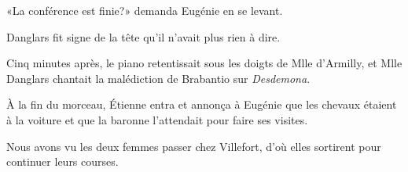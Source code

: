«La conférence est finie?» demanda Eugénie en se levant. 

Danglars fit signe de la tête qu'il n'avait plus rien à dire. 

Cinq minutes après, le piano retentissait sous les doigts de Mlle d'Armilly, et Mlle Danglars chantait la malédiction de Brabantio sur \textit{Desdemona}. 

À la fin du morceau, Étienne entra et annonça à Eugénie que les chevaux étaient à la voiture et que la baronne l'attendait pour faire ses visites. 

Nous avons vu les deux femmes passer chez Villefort, d'où elles sortirent pour continuer leurs courses. 
